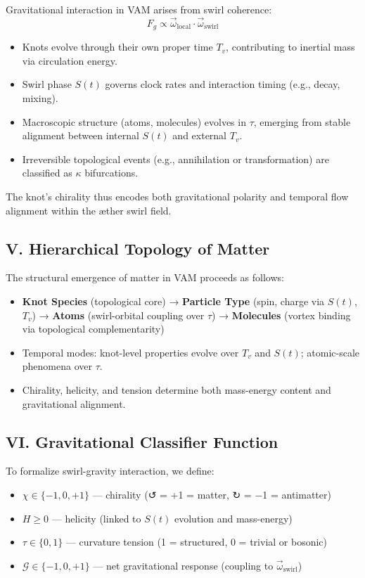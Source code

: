 \documentclass[12pt]{article}
\begin{document}
Gravitational interaction in VAM arises from swirl coherence:
\[
F_g \propto \vec{\omega}_\text{local} \cdot \vec{\omega}_\text{swirl}
\]

\begin{itemize}
 \item  Knots evolve through their own proper time $T_v$, contributing to inertial mass via circulation energy.
 \item  Swirl phase $S(t)$ governs clock rates and interaction timing (e.g., decay, mixing).
 \item  Macroscopic structure (atoms, molecules) evolves in $\tau$, emerging from stable alignment between internal $S(t)$ and external $T_v$.
 \item  Irreversible topological events (e.g., annihilation or transformation) are classified as $\kappa$ bifurcations.
\end{itemize}

The knot’s chirality thus encodes both gravitational polarity and temporal flow alignment within the æther swirl field.


\subsection*{V. Hierarchical Topology of Matter}

The structural emergence of matter in VAM proceeds as follows:

\begin{itemize}
    \item \textbf{Knot Species} (topological core) →
          \textbf{Particle Type} (spin, charge via $S(t)$, $T_v$) →
          \textbf{Atoms} (swirl-orbital coupling over $\tau$) →
          \textbf{Molecules} (vortex binding via topological complementarity)
    \item Temporal modes: knot-level properties evolve over $T_v$ and $S(t)$; atomic-scale phenomena over $\tau$.
    \item Chirality, helicity, and tension determine both mass-energy content and gravitational alignment.
\end{itemize}

\subsection*{VI. Gravitational Classifier Function}

To formalize swirl-gravity interaction, we define:

\begin{itemize}
    \item $\chi \in \{-1, 0, +1\}$ — chirality (↺ = +1 = matter, ↻ = −1 = antimatter)
    \item $H \geq 0$ — helicity (linked to $S(t)$ evolution and mass-energy)
    \item $\tau \in \{0,1\}$ — curvature tension (1 = structured, 0 = trivial or bosonic)
    \item $\mathcal{G} \in \{-1, 0, +1\}$ — net gravitational response (coupling to $\vec{\omega}_\text{swirl}$)
\end{itemize}
\end{document}
